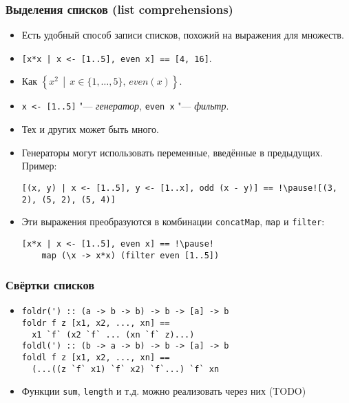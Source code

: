 \documentclass[11pt]{beamer}
\begin{document}
\begin{frame}[fragile]
\frametitle{Выделения списков (list comprehensions)}
\begin{itemize}
    \item Есть удобный способ записи списков, похожий на выражения для множеств.
    \item[] \lstinline![x*x | x <- [1..5], even x] == !\pause \lstinline|[4, 16]|.
    \item Как \(\left\{x^2\,\middle|\,x \in \{1, \ldots, 5\},\,even(x)\right\}\).
    \item \lstinline!x <- [1..5]! "--- \emph{генератор}, \lstinline|even x| "--- \emph{фильтр}.
    \pause
    \item Тех и других может быть много.
    \item Генераторы могут использовать переменные, введённые в предыдущих. Пример:
\begin{lstlisting}[basicstyle=\ttfamily\footnotesize]
[(x, y) | x <- [1..5], y <- [1..x], odd (x - y)] == !\pause![(3, 2), (5, 2), (5, 4)]
\end{lstlisting}
    \item Эти выражения преобразуются в комбинации \lstinline|concatMap|, \lstinline|map| и \lstinline|filter|:
\begin{lstlisting}[basicstyle=\ttfamily\footnotesize]
[x*x | x <- [1..5], even x] == !\pause!
    map (\x -> x*x) (filter even [1..5])
\end{lstlisting}
\end{itemize}
\end{frame}

\begin{frame}[fragile]
\frametitle{Свёртки списков}
\begin{itemize}
    \item 
\begin{lstlisting}
foldr(') :: (a -> b -> b) -> b -> [a] -> b
foldr f z [x1, x2, ..., xn] == 
  x1 `f` (x2 `f` ... (xn `f` z)...)
foldl(') :: (b -> a -> b) -> b -> [a] -> b
foldl f z [x1, x2, ..., xn] == 
  (...((z `f` x1) `f` x2) `f`...) `f` xn
\end{lstlisting}
    \item Функции \lstinline|sum|, \lstinline|length| и т.д. можно реализовать через них (TODO)
\end{itemize}
\end{frame}
\end{document}
